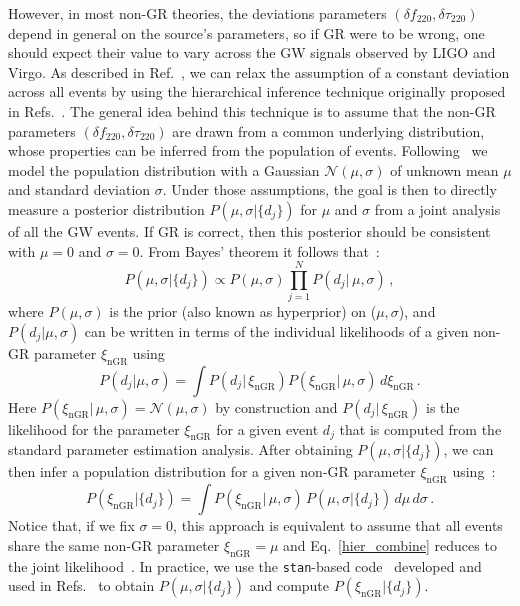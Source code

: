 \documentclass[twocolumn,prd,aps,superscriptaddress,preprintnumbers,tightenlines,showpacs,nofootinbib,eqsecnum,amsfonts,amsmath]{revtex4-1}
\newcommand{\df}[1]{\delta f_{\text{#1}}}
\newcommand{\dtau}[1]{\delta \tau_{\text{#1}}}
\begin{document}
However, in most non-GR theories, the deviations parameters $(\df{220},\dtau{220})$ depend in general on the source's parameters, so if GR were to be wrong, one should expect their value to vary across the GW signals observed by LIGO and Virgo.
As described in Ref.~\cite{Abbott:2020jks}, we can relax the assumption of a constant deviation across all events by using the hierarchical inference technique originally proposed in Refs.~\cite{Zimmerman:2019wzo,Isi:2019asy}. The general idea behind this technique is to assume that the non-GR parameters $(\df{220},\dtau{220})$ are drawn from a common underlying distribution, whose properties can be inferred from the population of events. Following~\cite{Zimmerman:2019wzo,Isi:2019asy,Abbott:2020jks} we model the population distribution with a Gaussian  $\mathcal{N}(\mu,\sigma)$ of unknown mean $\mu$ and standard deviation $\sigma$. Under those assumptions, the goal is then to directly measure a posterior distribution $P(\mu, \sigma |  \{d_j\}) $ for $\mu$ and $\sigma$ from a joint analysis of all the GW events. If GR is correct, then this posterior should be consistent with $\mu=0$ and $\sigma=0$. From Bayes' theorem it follows that~\cite{Isi:2019asy}:
%
\begin{equation}
P(\mu, \sigma |  \{d_j\}) \propto P(\mu,\sigma)\prod _{j=1}^N P(d_j |\, \mu, \sigma) \,,
\end{equation}
%
where $P(\mu,\sigma)$ is the prior (also known as hyperprior) on ($\mu,\sigma$), and $P(d_j | \mu, \sigma) $ can be written in terms of the individual likelihoods of a given non-GR parameter $\xi_{\text{nGR}}$ using~\cite{Isi:2019asy}
%
\begin{equation}
P(d_j | \mu, \sigma) = \int P(d_j |\, \xi_{\text{nGR}})  P(\xi_{\text{nGR}} |\, \mu, \sigma) \,d\xi_{\text{nGR}} \,.
\end{equation}
%
Here $P(\xi_{\text{nGR}} | \,\mu, \sigma) = \mathcal{N}(\mu,\sigma)$ by construction and $P(d_j |\, \xi_{\text{nGR}})$ is the likelihood for the parameter $\xi_{\text{nGR}}$ for a given event $d_j$ that is computed from the standard parameter estimation analysis. After obtaining $P(\mu, \sigma |  \{d_j\})$, we can then infer a population distribution for a given non-GR parameter $\xi_{\text{nGR}}$ using~\cite{Isi:2019asy}:
%
\begin{equation}\label{hier_combine}
P(\xi_{\text{nGR}} | \{d_j\}) = \int P(\xi_{\text{nGR}} |\, \mu, \sigma)\,P(\mu, \sigma |  \{d_j\})\,d\mu\,d\sigma \,.
\end{equation}
%
Notice that, if we fix $\sigma=0$, this approach is equivalent to assume that all events share the same non-GR parameter $\xi_{\text{nGR}} =\mu$ and Eq.~\eqref{hier_combine} reduces to the joint likelihood~\cite{Zimmerman:2019wzo}. In practice, we use the \texttt{stan}-based code~\cite{stan} developed and used in Refs.~\cite{Isi:2019asy,Abbott:2020jks} to obtain $P(\mu, \sigma |  \{d_j\}) $ and compute $P(\xi_{\text{nGR}} | \{d_j\})$.
\end{document}
